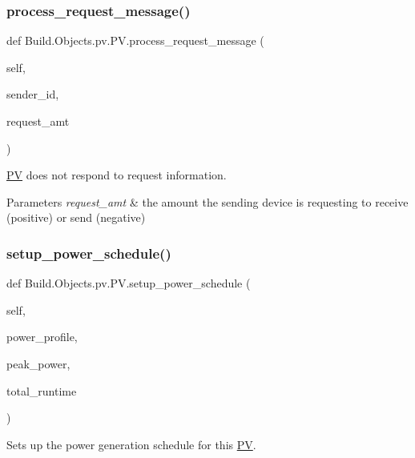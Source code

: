 \subsubsection{\texorpdfstring{process\+\_\+request\+\_\+message()}{process\_request\_message()}}
{\footnotesize\ttfamily def Build.\+Objects.\+pv.\+P\+V.\+process\+\_\+request\+\_\+message (\begin{DoxyParamCaption}\item[{}]{self,  }\item[{}]{sender\+\_\+id,  }\item[{}]{request\+\_\+amt }\end{DoxyParamCaption})}



\hyperlink{class_build_1_1_objects_1_1pv_1_1_p_v}{PV} does not respond to request information. 


\begin{DoxyParams}{Parameters}
{\em request\+\_\+amt} & the amount the sending device is requesting to receive (positive) or send (negative) \\
\hline
\end{DoxyParams}
\mbox{\label{class_build_1_1_objects_1_1pv_1_1_p_v_a8c06b93d9d13ee9b6991c3b498bf469e}} 
\subsubsection{\texorpdfstring{setup\+\_\+power\+\_\+schedule()}{setup\_power\_schedule()}}
{\footnotesize\ttfamily def Build.\+Objects.\+pv.\+P\+V.\+setup\+\_\+power\+\_\+schedule (\begin{DoxyParamCaption}\item[{}]{self,  }\item[{}]{power\+\_\+profile,  }\item[{}]{peak\+\_\+power,  }\item[{}]{total\+\_\+runtime }\end{DoxyParamCaption})}



Sets up the power generation schedule for this \hyperlink{class_build_1_1_objects_1_1pv_1_1_p_v}{PV}. 

